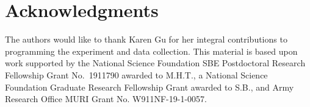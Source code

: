 \documentclass[10pt,letterpaper]{article}
\newcommand{\soph}[1]{\textcolor{Green}{[sb: #1]}}
\begin{document}







\newpage
\section{Acknowledgments}


The authors would like to thank Karen Gu for her integral contributions to programming the experiment and data collection. 
This material is based upon work supported by the National Science Foundation SBE Postdoctoral Research Fellowship Grant No.~1911790 awarded to M.H.T., a National Science Foundation Graduate Research Fellowship Grant awarded to S.B., and Army Research Office MURI Grant No. W911NF-19-1-0057.



\setlength{\bibleftmargin}{.125in}
\setlength{\bibindent}{-\bibleftmargin}


\end{document}
